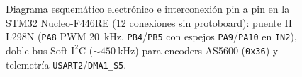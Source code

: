 \begin{figure}[!t]
{\begin{circuitikz}
\end{circuitikz}%
}%
\caption{Diagrama esquemático electrónico e interconexión pin a pin en la STM32 Nucleo-F446RE (12 conexiones sin protoboard): puente H L298N (\texttt{PA8} PWM \qty{20}{\kilo\hertz}, \texttt{PB4}/\texttt{PB5} con espejos \texttt{PA9}/\texttt{PA10} en \texttt{IN2}), doble bus Soft-$\text{I}^2\text{C}$ ($\sim\qty{450}{\kilo\hertz}$) para encoders AS5600 (\texttt{0x36}) y telemetría \texttt{USART2}/\texttt{DMA1\_S5}.}
\label{fig:esquematico_electronico}
\end{figure}
